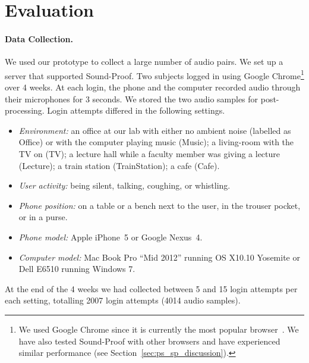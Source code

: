 \section{Evaluation}
\label{sec:ps_sp_evaluation}

\paragraph{Data Collection.}
We used our prototype to collect a large number of audio pairs.
We set up a server that supported Sound-Proof.
Two subjects logged in using Google Chrome\footnote{We used Google Chrome since it is currently the most popular browser~\cite{statcounter}. We have also tested
Sound-Proof with other browsers and have experienced similar performance (see Section~\ref{sec:ps_sp_discussion}).} over 4 weeks.
At each login, the phone and the computer recorded audio through their microphones for 3 seconds.
We stored the two audio samples for post-processing.
Login attempts differed in the following settings.

\begin{itemize}
\item \emph{Environment:}
an office at our lab with either no ambient noise (labelled as Office) or with the computer playing music (Music);
a living-room with the TV on (TV);
a lecture hall while a faculty member was giving a lecture (Lecture);
a train station (TrainStation);
a cafe (Cafe).
\item \emph{User activity:} being silent,  talking, coughing, or whistling.
\item \emph{Phone position:} on a table or a bench next to the user, in the trouser pocket, or in a purse.
\item \emph{Phone model:} Apple iPhone~5 or Google Nexus~4.
\item \emph{Computer model:} Mac Book Pro ``Mid 2012'' running OS X10.10 Yosemite or Dell E6510 running Windows 7.
\end{itemize}



At the end of the 4 weeks we had collected between 5 and 15 login attempts per each setting, totalling
2007 login attempts (4014 audio samples).

